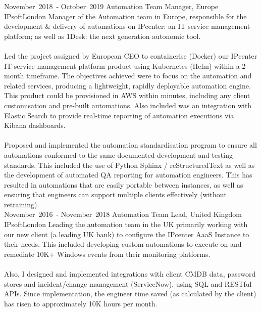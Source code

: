 
\edef\hc{\string:}

\cventry %
  {\mbox{November 2018 -} \mbox{October 2019}}
  {Automation Team Manager, Europe}
  {IPsoft}{London}{}
  { 
    Manager of the Automation team in Europe, responsible for the 
    development \& delivery of automations on IPcenter: an IT service management 
    platform; as well as 1Desk: the next generation autonomic tool.\\~\\
    Led the project assigned by European CEO to containerise (Docker) our IPcenter 
    IT service management platform product using Kubernetes (Helm) within a 2-month timeframe. 
    The objectives achieved were to focus on the automation and related services, 
    producing a lightweight, rapidly deployable automation engine. 
    This product could be provisioned in AWS within minutes, including any client 
    customisation and pre-built automations. 
    Also included was an integration with Elastic Search to provide real-time 
    reporting of automation executions via Kibana dashboards.\\~\\
    Proposed and implemented the automation standardisation program to ensure all 
    automations conformed to the same documented development and testing standards. 
    This included the use of Python Sphinx / reStructuredText as well as the development 
    of automated QA reporting for automation engineers. 
    This has resulted in automations that are easily portable between instances, 
    as well as ensuring that engineers can support multiple clients effectively (without retraining).\\ 
  }
\cventry %
  {\mbox{November 2016 -} \mbox{November 2018}}
  {Automation Team Lead, United Kingdom}
  {IPsoft}{London}{}
  {
    Leading the automation team in the UK primarily working with our new client (a leading UK bank) to 
    configure the IPcenter AaaS Instance to their needs. This included developing custom 
    automations to execute on and remediate 10K+ Windows events from their monitoring platforms.\\~\\ 
    Also, I designed and implemented integrations with client CMDB data, password stores 
    and incident/change management (ServiceNow), using SQL and RESTful APIs. Since 
    implementation, the engineer time saved (as calculated by the client) has risen to approximately 
    10K hours per month.\\
  }

